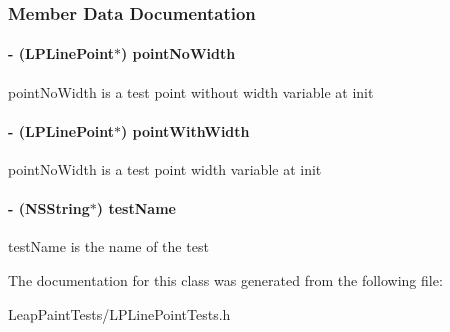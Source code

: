 \subsubsection{Member Data Documentation}
\hypertarget{interface_l_p_line_point_tests_a394e0cb6bce4468b8d5dc75bbc93a661}{
\paragraph[{point\-No\-Width}]{\setlength{\rightskip}{0pt plus 5cm}-\/ ({\bf L\-P\-Line\-Point}$\ast$) point\-No\-Width\hspace{0.3cm}{\ttfamily [protected]}}}\label{d0/d38/interface_l_p_line_point_tests_a394e0cb6bce4468b8d5dc75bbc93a661}
point\-No\-Width is a test point without width variable at init \hypertarget{interface_l_p_line_point_tests_ae9ab9ef2f204af865b213e3eab7b81af}{
\paragraph[{point\-With\-Width}]{\setlength{\rightskip}{0pt plus 5cm}-\/ ({\bf L\-P\-Line\-Point}$\ast$) point\-With\-Width\hspace{0.3cm}{\ttfamily [protected]}}}\label{d0/d38/interface_l_p_line_point_tests_ae9ab9ef2f204af865b213e3eab7b81af}
point\-No\-Width is a test point width variable at init \hypertarget{interface_l_p_line_point_tests_a64e9eeb3c879bcb9e97b51bdc3aea372}{
\paragraph[{test\-Name}]{\setlength{\rightskip}{0pt plus 5cm}-\/ (N\-S\-String$\ast$) test\-Name\hspace{0.3cm}{\ttfamily [protected]}}}\label{d0/d38/interface_l_p_line_point_tests_a64e9eeb3c879bcb9e97b51bdc3aea372}
test\-Name is the name of the test 

The documentation for this class was generated from the following file\-:\begin{DoxyCompactItemize}
\item 
Leap\-Paint\-Tests/L\-P\-Line\-Point\-Tests.\-h\end{DoxyCompactItemize}
